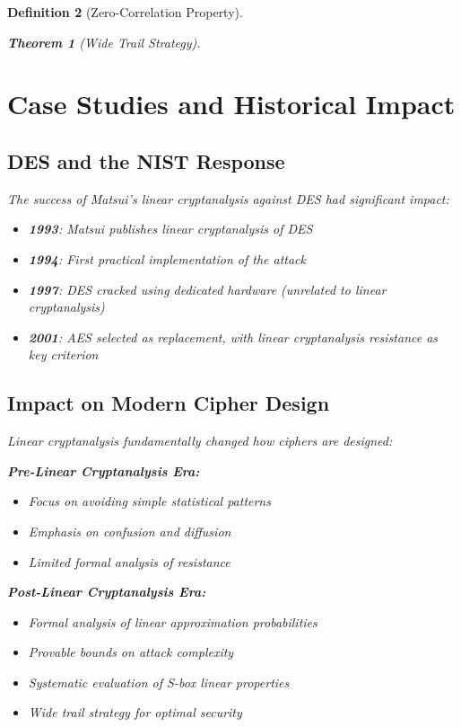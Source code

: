 \documentclass[12pt,a4paper]{article}
\newtheorem{theorem}{Theorem}[section]
\newtheorem{definition}[theorem]{Definition}
\begin{document}
\begin{definition}[Zero-Correlation Property]
\begin{theorem}[Wide Trail Strategy]
\section{Case Studies and Historical Impact}

\subsection{DES and the NIST Response}

The success of Matsui's linear cryptanalysis against DES had significant impact:

\begin{examplebox}[title=Historical Timeline]
\begin{itemize}
    \item \textbf{1993}: Matsui publishes linear cryptanalysis of DES
    \item \textbf{1994}: First practical implementation of the attack
    \item \textbf{1997}: DES cracked using dedicated hardware (unrelated to linear cryptanalysis)
    \item \textbf{2001}: AES selected as replacement, with linear cryptanalysis resistance as key criterion
\end{itemize}
\end{examplebox}

\subsection{Impact on Modern Cipher Design}

Linear cryptanalysis fundamentally changed how ciphers are designed:

\begin{defenseBox}[title=Design Philosophy Changes]
\textbf{Pre-Linear Cryptanalysis Era:}
\begin{itemize}
    \item Focus on avoiding simple statistical patterns
    \item Emphasis on confusion and diffusion
    \item Limited formal analysis of resistance
\end{itemize}

\textbf{Post-Linear Cryptanalysis Era:}
\begin{itemize}
    \item Formal analysis of linear approximation probabilities
    \item Provable bounds on attack complexity
    \item Systematic evaluation of S-box linear properties
    \item Wide trail strategy for optimal security
\end{itemize}
\end{defenseBox}


\end{theorem}
\end{definition}
\end{document}
